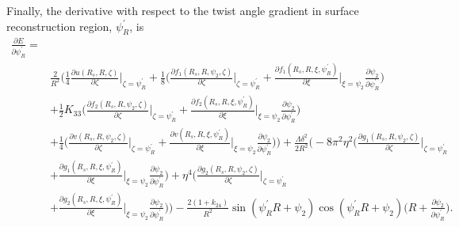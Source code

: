 \documentclass[12pt]{article}
\begin{document}
Finally, the derivative with respect to the twist angle gradient in surface reconstruction region, $\psi_R^{\prime}$, is
\begin{align}
\frac{\partial E}{\partial \psi_R^{\prime}}=&\nonumber\\
&\frac{2}{R^2}\bigg(\frac{1}{4}\frac{\partial u(R_s,R,\zeta)}{\partial\zeta}\bigg|_{\zeta=\psi_R^{\prime}}+\frac{1}{8}\bigg(\frac{\partial f_1(R_s,R,\psi_2,\zeta)}{\partial\zeta}\bigg|_{\zeta=\psi_R^{\prime}}+\frac{\partial f_1(R_s,R,\xi,\psi_R^{\prime})}{\partial\xi}\bigg|_{\xi=\psi_2}\frac{\partial\psi_2}{\partial\psi_R^{\prime}}\bigg)\nonumber\\
&+\frac{1}{2}K_{33}\bigg(\frac{\partial f_2(R_s,R,\psi_2,\zeta)}{\partial\zeta}\bigg|_{\zeta=\psi_R^{\prime}}+\frac{\partial f_2(R_s,R,\xi,\psi_R^{\prime})}{\partial\xi}\bigg|_{\xi=\psi_2}\frac{\partial\psi_2}{\partial\psi_R^{\prime}}\bigg)\nonumber\\
&+\frac{1}{4}\bigg(\frac{\partial v(R_s,R,\psi_2,\zeta)}{\partial\zeta}\bigg|_{\zeta=\psi_R^{\prime}}+\frac{\partial v(R_s,R,\xi,\psi_R^{\prime})}{\partial\xi}\bigg|_{\xi=\psi_2}\frac{\partial\psi_2}{\partial\psi_R^{\prime}}\bigg)\bigg)+\frac{\Lambda\delta^2}{2R^2}\bigg(-8\pi^2\eta^2\bigg(\frac{\partial g_1(R_s,R,\psi_2,\zeta)}{\partial\zeta}\bigg|_{\zeta=\psi_R^{\prime}}\nonumber\\
&+\frac{\partial g_1(R_s,R,\xi,\psi_R^{\prime})}{\partial\xi}\bigg|_{\xi=\psi_2}\frac{\partial\psi_2}{\partial\psi_R^{\prime}}\bigg)+\eta^4\bigg(\frac{\partial g_2(R_s,R,\psi_2,\zeta)}{\partial\zeta}\bigg|_{\zeta=\psi_R^{\prime}}\nonumber\\
&+\frac{\partial g_2(R_s,R,\xi,\psi_R^{\prime})}{\partial\xi}\bigg|_{\xi=\psi_2}\frac{\partial\psi_2}{\partial\psi_R^{\prime}}\bigg)\bigg)-\frac{2(1+k_{24})}{R^2}\sin(\psi_R^{\prime}R+\psi_2)\cos(\psi_R^{\prime}R+\psi_2)\bigg(R+\frac{\partial\psi_2}{\partial\psi_R^{\prime}}\bigg).\label{eq:dEdpsi_Rc}
\end{align}
\end{document}
